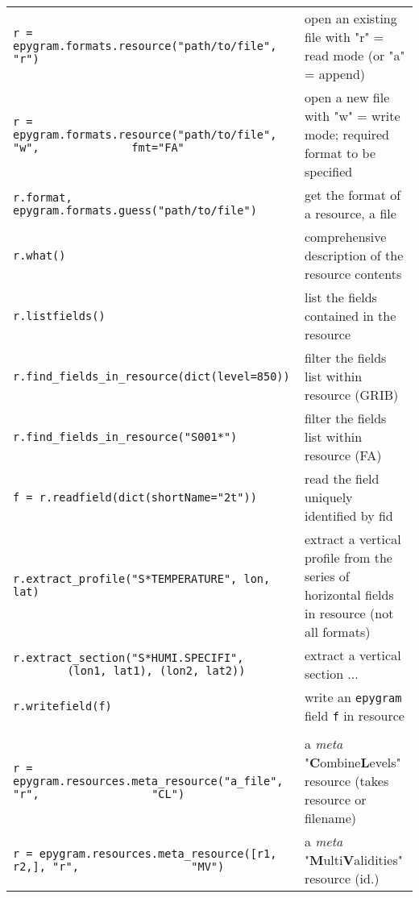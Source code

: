 \documentclass[a4paper,10pt]{article}
\begin{document}
\begin{tabular}{|p{9.5cm}|p{9.5cm}|}
\hline
\rowcolor{gray!50}
\multicolumn{2}{|c|}{\textbf{Resources}}\\
\hline
\texttt{r = epygram.formats.resource("path/to/file", "r")} & open an existing file with "r" = read mode (or "a" = append)\\
\texttt{r = epygram.formats.resource("path/to/file", "w",
$~~~~~~~~~~~~~~~~~~~~~~~~~~~~~~$fmt="FA"} & open a new file with "w" = write mode; required format to be specified\\
\texttt{r.format, epygram.formats.guess("path/to/file")} & get the format of a resource, a file\\
\texttt{r.what()} & comprehensive description of the resource contents\\
\texttt{r.listfields()} & list the fields contained in the resource\\
\texttt{r.find\_fields\_in\_resource(dict(level=850))} & filter the fields list within resource (GRIB)\\
\texttt{r.find\_fields\_in\_resource("S001*")} & filter the fields list within resource (FA)\\
\texttt{f = r.readfield(dict(shortName="2t"))} & read the field uniquely identified by fid\\
\texttt{r.extract\_profile("S*TEMPERATURE", lon, lat)} & extract a vertical profile from the series of horizontal fields in resource (not all formats)\\
\texttt{r.extract\_section("S*HUMI.SPECIFI",
$~~~~~~~~~~~~~~~~~~~$(lon1, lat1), (lon2, lat2))} & extract a vertical section ...\\
\texttt{r.writefield(f)} & write an \texttt{epygram} field \texttt{f} in resource\\
\hline

\rowcolor{gray!50}
\multicolumn{2}{|c|}{\textbf{Meta-Resources}}\\
\hline
\texttt{r = epygram.resources.meta\_resource("a\_file", "r",
$~~~~~~~~~~~~~~~~~~~~~~~~~~~~~~~~~~~~~$"CL")} & a \textit{meta} "\textbf{C}ombine\textbf{L}evels" resource (takes resource or filename)\\
\texttt{r = epygram.resources.meta\_resource([r1, r2,], "r",
$~~~~~~~~~~~~~~~~~~~~~~~~~~~~~~~~~~~~~$"MV")}& a \textit{meta} "\textbf{M}ulti\textbf{V}alidities" resource (id.)\\
\hline
\end{tabular}\\
\\
\end{document}
